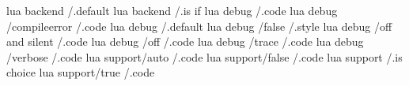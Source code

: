 lua backend                                  /.default                         
lua backend                                  /.is if                           
lua debug                                    /.code                            
lua debug  /compileerror                     /.code
lua debug                                    /.default                         
lua debug  /false                            /.style
lua debug  /off and silent                   /.code
lua debug  /off                              /.code
lua debug  /trace                            /.code
lua debug  /verbose                          /.code
lua support/auto                             /.code
lua support/false                            /.code
lua support                                  /.is choice
lua support/true                             /.code

